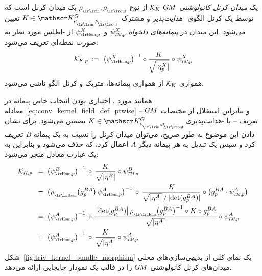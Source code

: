 \begin{dfn}
\label{dfn:conv_kernel_field}
    یک \emph{میدان کرنل کانولوشنی $G\mkern-1.4muM$} $\mathcal{K}_{\mkern-2mu K}$ از نوع $\rhoin,\rhoout$ یک میدان کرنل است که توسط یک کرنل الگوی \emph{-هدایت‌پذیر} و مشترک $K \in \KG$ تعیین می‌شود.
    این میدان در \emph{پیمانه‌های دلخواه} $\psiTMp^X$ و $\psiHomp^X\,$ از -اطلس مورد نظر به صورت نقطه‌ای تعریف می‌شود:
    \begin{align}\label{eq:conv_kernel_field_def_ptwise}
        \KKp \,:=\ \big(\psiHomp^X\big)^{\mkern-2mu-1} \circ \frac{K}{\sqrt{|\eta_p^X|}} \circ \psiTMp^X
    \end{align}
    همواری $\mathcal{K}_{\mkern-2mu K}$ از همواری پیمانه‌ها، متریک و کرنل الگو ناشی می‌شود.
\end{dfn}
همانند مورد \onexoneGMsfarsi، اختیاری بودن انتخاب خاص پیمانه در معادله~\eqref{eq:conv_kernel_field_def_ptwise} -- و بنابراین استقلال از مختصات $G\mkern-1.4muM$ تعریف -- با -هدایت‌پذیری $K\in\KG\!$ تضمین می‌شود.
برای نشان دادن این موضوع به طور صریح، می‌توان میدان کرنل را نسبت به یک پیمانه $B$ تعریف کرد و سپس یک تبدیل به هر پیمانه دیگر $A$ اعمال کرد، که حذف می‌شود و بنابراین به یک عبارت معادل منجر می‌شود:
\begin{align}\label{eq:arbitrariness_gauge_GM_kernel_field_def}
    \KKp
    \,\ =&\,\ \big(\psiHomp^B \big)^{-1} \,\circ \,\frac{K}{\sqrt{|\eta^B|}} \circ \psiTMp^B \notag \\
    \,\ =&\,\ \big( \rhoHom\big(g_p^{BA}\big)\, \psiHomp^A \big)^{-1} \,\circ \,\frac{K}{\sqrt{|\eta^A|} \,/\, |\! \det(g_p^{BA})| } \circ \big( g_p^{BA}\cdot \psiTMp^A \big) \notag \\
    \,\ =&\,\ \big(\psiHomp^A \big)^{-1} \,\circ \frac{\,\big|\! \det(g_p^{BA})\big|\, \rhoHom\big(g_p^{BA}\big)^{-1} \circ K \circ g_p^{BA}}{\sqrt{|\eta^A|}} \circ \psiTMp^A \notag \\
    \,\ =&\,\ \big(\psiHomp^A \big)^{-1} \,\circ \,\frac{K}{\sqrt{|\eta^A|}} \circ \psiTMp^A
\end{align}
شکل~\ref{fig:triv_kernel_bundle_morphism} یک نمای کلی از بدیهی‌سازی‌های محلی میدان‌های کرنل کانولوشنی $G\mkern-1.4muM$ را در قالب یک نمودار جابجایی ارائه می‌دهد.

